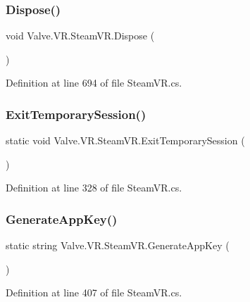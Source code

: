 \subsubsection{\texorpdfstring{Dispose()}{Dispose()}}
{\footnotesize\ttfamily void Valve.\+V\+R.\+Steam\+V\+R.\+Dispose (\begin{DoxyParamCaption}{ }\end{DoxyParamCaption})}



Definition at line 694 of file Steam\+V\+R.\+cs.

\mbox{\label{class_valve_1_1_v_r_1_1_steam_v_r_afb99eabf5440c7e76beefad597182ee1}} 
\subsubsection{\texorpdfstring{ExitTemporarySession()}{ExitTemporarySession()}}
{\footnotesize\ttfamily static void Valve.\+V\+R.\+Steam\+V\+R.\+Exit\+Temporary\+Session (\begin{DoxyParamCaption}{ }\end{DoxyParamCaption})\hspace{0.3cm}{\ttfamily [static]}}



Definition at line 328 of file Steam\+V\+R.\+cs.

\mbox{\label{class_valve_1_1_v_r_1_1_steam_v_r_a98cdf4fc1441a46697f3e5c6d58f40c6}} 
\subsubsection{\texorpdfstring{GenerateAppKey()}{GenerateAppKey()}}
{\footnotesize\ttfamily static string Valve.\+V\+R.\+Steam\+V\+R.\+Generate\+App\+Key (\begin{DoxyParamCaption}{ }\end{DoxyParamCaption})\hspace{0.3cm}{\ttfamily [static]}}



Definition at line 407 of file Steam\+V\+R.\+cs.

